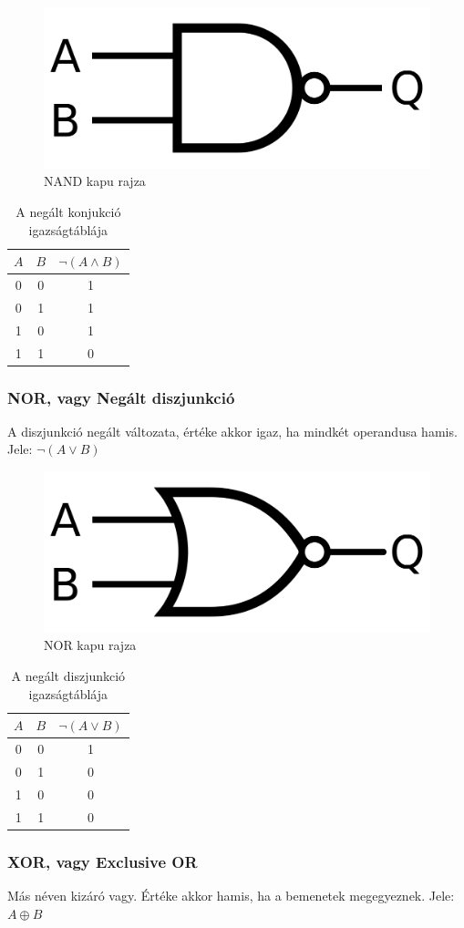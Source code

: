\documentclass[
]{thesis-ekf}
\theoremstyle{definition}
\theoremstyle{remark}
\begin{document}
\begin{figure}[H]
	\centering
	\includegraphics[width=0.3\linewidth]{nand}
	\caption{NAND kapu rajza}
	\label{fig:nand}
\end{figure}


\begin{table}[H]
	\centering
	\begin{tabular}{c|c|c}
		$A$ & $B$ & $\neg(A \land B)$\\               
		\hline
		0 & 0 & 1\\
		0 & 1 & 1\\
		1 & 0 & 1\\
		1 & 1 & 0
	\end{tabular}
	\caption{A negált konjukció igazságtáblája}
\end{table}

\subsubsection{NOR, vagy Negált diszjunkció}
A diszjunkció negált változata, értéke akkor igaz, ha mindkét operandusa hamis. Jele: $\neg(A \lor B)$

\begin{figure}[H]
	\centering
	\includegraphics[width=0.3\linewidth]{nor}
	\caption{NOR kapu rajza}
	\label{fig:nor}
\end{figure}


\begin{table}[H]
	\centering
	\begin{tabular}{c|c|c}
		$A$ & $B$ & $\neg(A \lor B)$\\               
		\hline
		0 & 0 & 1\\
		0 & 1 & 0\\
		1 & 0 & 0\\
		1 & 1 & 0
	\end{tabular}
	\caption{A negált diszjunkció igazságtáblája}
\end{table}


\subsubsection{XOR, vagy Exclusive OR}
Más néven kizáró vagy. Értéke akkor hamis, ha a bemenetek megegyeznek. Jele: $A \oplus B$
\end{document}
